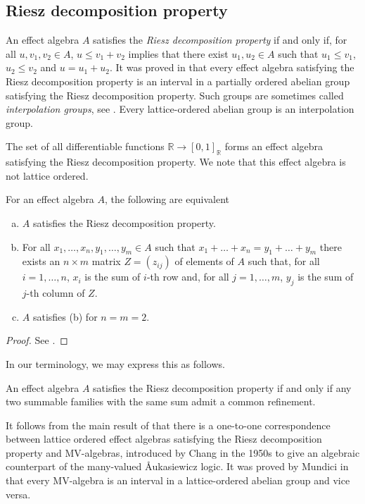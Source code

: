 \documentclass[smallextended]{svjour3}
\begin{document}
\subsection{Riesz decomposition property}

An effect algebra $A$ satisfies the {\em Riesz decomposition property} if and
only if, for all $u,v_1,v_2\in A$, $u\leq v_1+v_2$ implies that there exist
$u_1,u_2\in A$ such that $u_1\leq v_1$, $u_2\leq v_2$ and $u=u_1+u_2$. It was
proved in \cite{Rav:OaSToEA} that every effect algebra satisfying the Riesz
decomposition property is an interval in a partially ordered abelian group
satisfying the Riesz decomposition property. Such groups are
sometimes called {\em interpolation groups}, see \cite{Goo:POAGwI}. Every
lattice-ordered abelian group is an interpolation group.

\begin{example}
The set of all differentiable functions $\mathbb R\to [0,1]_{\mathbb R}$
forms an effect algebra satisfying the Riesz decomposition property. We note
that this effect algebra is not lattice ordered.
\end{example}

\begin{proposition}
For an effect algebra $A$, the following are equivalent
\begin{enumerate}[(a)]
\item $A$ satisfies the Riesz decomposition property.
\item For all $x_1,\dots,x_n,y_1,\dots,y_m\in A$ such that
$x_1+\dots+x_n=y_1+\dots+y_m$ there exists an $n\times m$ matrix
$Z=(z_{ij})$ of elements of $A$ such that, for all
$i=1,\dots,n$, $x_i$ is the sum of $i$-th row and, for
all $j=1,\dots,m$, $y_j$ is the sum of $j$-th column of $Z$.
\item $A$ satisfies (b) for $n=m=2$.
\end{enumerate}
\end{proposition}
\begin{proof}
See \cite[Section 1.7]{DvuPul:NTiQS}.
\end{proof}

In our terminology, we may express this as follows.
\begin{proposition}
An effect algebra $A$ satisfies the Riesz decomposition property if and only if
any two summable families with the same sum admit a common refinement.
\end{proposition}

It follows from the main result of \cite{ChoKop:BDP} that there
is a one-to-one correspondence between lattice ordered effect algebras satisfying
the Riesz decomposition property and MV-algebras, introduced by Chang 
\cite{Cha:AAoMVL} in the 1950s to give an algebraic counterpart of the many-valued Åukasiewicz
logic. It was proved by Mundici in \cite{Mun:IoAFCSAiLSC} that 
every MV-algebra is an interval in a lattice-ordered
abelian group and vice versa.
\end{document}
